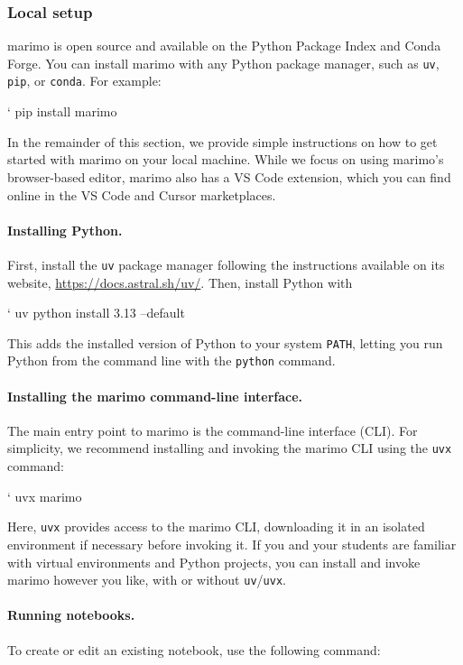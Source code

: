 \documentclass{article}
\begin{document}
\subsubsection{Local setup}

marimo is open source and available on the Python Package Index and Conda Forge.
You can install marimo with any Python package manager, such as \texttt{uv}, \texttt{pip},
or \texttt{conda}. For example:

\begin{shellcmd}
` pip install marimo
\end{shellcmd}
In the remainder of this section, we provide simple instructions on how to get
started with marimo on your local machine. While we focus on using marimo's
browser-based editor, marimo also has a VS Code extension, which you can find
online in the VS Code and Cursor marketplaces.


\paragraph{Installing Python.}
First, install the \verb|uv| package manager following the instructions available on
its website, \url{https://docs.astral.sh/uv/}.
Then, install Python with
\begin{shellcmd}
` uv python install 3.13 --default
\end{shellcmd}
This adds the installed version of Python to your system \verb|PATH|, letting
you run Python from the command line with the \verb|python| command.

\paragraph{Installing the marimo command-line interface.} The main entry point to marimo
is the command-line interface (CLI). For simplicity, we recommend installing
and invoking the marimo CLI using the \texttt{uvx} command:

\begin{shellcmd}
` uvx marimo
\end{shellcmd}
Here, \texttt{uvx} provides access to the marimo CLI, downloading it in an isolated environment
if necessary before invoking it. If you and your students are familiar with
virtual environments and Python projects, you can install and invoke marimo
however you like, with or without \texttt{uv}/\texttt{uvx}.

\paragraph{Running notebooks.}
To create or edit an existing notebook, use the following command:
\end{document}
